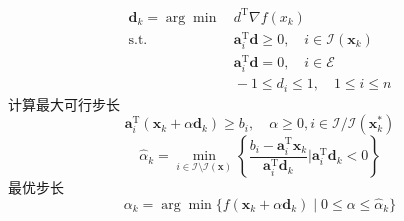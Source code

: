 \[
    \begin{aligned}
        \boldsymbol{d}_{k}=\arg\min &\, d^{\mathrm{T}}\nabla f(x_{k})  \\
        \mathrm{s.t.}&\, \boldsymbol{a}_i^\mathrm{T}\boldsymbol{d}\geqslant0,\quad i\in\mathcal{I}(\boldsymbol{x}_k)  \\
        &\,\boldsymbol{a}_{i}^{\mathrm{T}}\boldsymbol{d}=0,\quad i\in\mathcal{E} \\
        &\,-1\leqslant d_{i}\leqslant1,\quad1\leqslant i\leqslant n
    \end{aligned}
\]
计算最大可行步长
\[
    \boldsymbol{a}_{i}^{\mathrm{T}}(\boldsymbol{x}_{k}+\alpha \boldsymbol{d}_{k})\geqslant b_{i},\quad\alpha\geq0,i\in\mathcal{I}/\mathcal{I}(\boldsymbol{x}_{k}^{*})
\]
\[
    \hat{\alpha}_k=\min_{i\in\mathcal{I}\setminus\mathcal{I}(\boldsymbol{x})}\left\{\frac{b_i-\boldsymbol{a}_i^\mathrm{T}\boldsymbol{x}_k}{\boldsymbol{a}_i^\mathrm{T}\boldsymbol{d}_k}|\boldsymbol{a}_i^\mathrm{T}\boldsymbol{d}_k<0\right\}
\]
最优步长
\[
    \alpha_{k}=\arg\operatorname*{min}\{f(\boldsymbol{x}_{k}+\alpha\boldsymbol{d}_{k})\mid0\leqslant\alpha\leqslant\hat{\alpha}_{k}\}
\]
